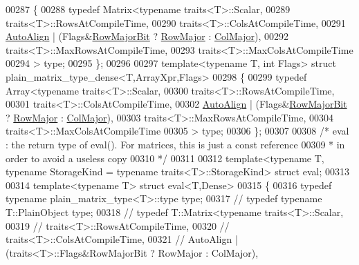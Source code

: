 \begin{DoxyCode}
{00287 \{
00288   \textcolor{keyword}{typedef} Matrix<typename traits<T>::Scalar,
00289                 traits<T>::RowsAtCompileTime,
00290                 traits<T>::ColsAtCompileTime,
00291                 \hyperlink{group__enums_ggaacded1a18ae58b0f554751f6cdf9eb13a28d63c0dd8560827162decfd898804f4}{AutoAlign} | (Flags&\hyperlink{group__flags_gae4f56c2a60bbe4bd2e44c5b19cbe8762}{RowMajorBit} ? \hyperlink{group__enums_ggaacded1a18ae58b0f554751f6cdf9eb13acfcde9cd8677c5f7caf6bd603666aae3}{RowMajor} : 
      \hyperlink{group__enums_ggaacded1a18ae58b0f554751f6cdf9eb13a0cbd4bdd0abcfc0224c5fcb5e4f6669a}{ColMajor}),
00292                 traits<T>::MaxRowsAtCompileTime,
00293                 traits<T>::MaxColsAtCompileTime
00294           > type;
00295 \};
00296 
00297 \textcolor{keyword}{template}<\textcolor{keyword}{typename} T, \textcolor{keywordtype}{int} Flags> \textcolor{keyword}{struct }plain\_matrix\_type\_dense<T,ArrayXpr,Flags>
00298 \{
00299   \textcolor{keyword}{typedef} Array<typename traits<T>::Scalar,
00300                 traits<T>::RowsAtCompileTime,
00301                 traits<T>::ColsAtCompileTime,
00302                 \hyperlink{group__enums_ggaacded1a18ae58b0f554751f6cdf9eb13a28d63c0dd8560827162decfd898804f4}{AutoAlign} | (Flags&\hyperlink{group__flags_gae4f56c2a60bbe4bd2e44c5b19cbe8762}{RowMajorBit} ? \hyperlink{group__enums_ggaacded1a18ae58b0f554751f6cdf9eb13acfcde9cd8677c5f7caf6bd603666aae3}{RowMajor} : 
      \hyperlink{group__enums_ggaacded1a18ae58b0f554751f6cdf9eb13a0cbd4bdd0abcfc0224c5fcb5e4f6669a}{ColMajor}),
00303                 traits<T>::MaxRowsAtCompileTime,
00304                 traits<T>::MaxColsAtCompileTime
00305           > type;
00306 \};
00307 
00308 \textcolor{comment}{/* eval : the return type of eval(). For matrices, this is just a const reference}
00309 \textcolor{comment}{ * in order to avoid a useless copy}
00310 \textcolor{comment}{ */}
00311 
00312 template<typename T, typename StorageKind = typename traits<T>::StorageKind> \textcolor{keyword}{struct }eval;
00313 
00314 \textcolor{keyword}{template}<\textcolor{keyword}{typename} T> \textcolor{keyword}{struct }eval<T,Dense>
00315 \{
00316   \textcolor{keyword}{typedef} \textcolor{keyword}{typename} plain\_matrix\_type<T>::type type;
00317 \textcolor{comment}{//   typedef typename T::PlainObject type;}
00318 \textcolor{comment}{//   typedef T::Matrix<typename traits<T>::Scalar,}
00319 \textcolor{comment}{//                 traits<T>::RowsAtCompileTime,}
00320 \textcolor{comment}{//                 traits<T>::ColsAtCompileTime,}
00321 \textcolor{comment}{//                 AutoAlign | (traits<T>::Flags&RowMajorBit ? RowMajor : ColMajor),}
}
\end{DoxyCode}
